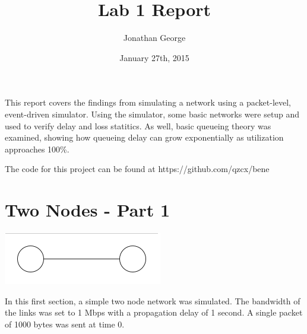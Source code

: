 \documentclass[11pt]{article}
\begin{document}
\lstset{
  language=Python,
  basicstyle=\small,          %
  keywordstyle=\bfseries,
  identifierstyle=,           %
  commentstyle=,              %
  stringstyle=\ttfamily,      %
  showstringspaces=false,     %
  numbers=left,
  numberstyle=\tiny,
  numbersep=5pt,
  frame=tb,
}

\title{Lab 1 Report}

\author{Jonathan George}

\date{January 27th, 2015}

\maketitle

This report covers the findings from simulating a network using a packet-level, event-driven simulator. Using the simulator, some basic networks were setup and used to verify delay and loss statitics. As well, basic queueing theory was examined, showing how queueing delay can grow exponentially as utilization approaches 100\%. 

The code for this project can be found at https://github.com/qzcx/bene

\section{Two Nodes - Part 1}

\includegraphics{TwoNodes.png}

In this first section, a simple two node network was simulated. The bandwidth of the links was set to 1 Mbps with a propagation delay of 1 second. A single packet of 1000 bytes was sent at time 0.
\end{document}
